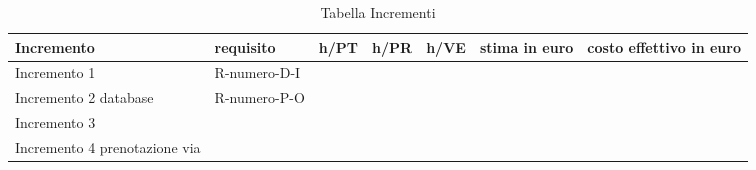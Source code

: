 \hypertarget{TabellaIncrementi}{}
\begin{longtable}{ C{0.15\textwidth} C{0.15\textwidth} C{0.1\textwidth} C{0.1\textwidth} C{0.1\textwidth} C{0.1\textwidth} C{0.1\textwidth} }
    \caption{Tabella Incrementi}                                                                                 \\
    \rowcolor{\primaryColor}
    \textcolor{\secondaryColor}{\textbf{Incremento}} & \textcolor{\secondaryColor}{\textbf{requisito}}& \textcolor{\secondaryColor}{\textbf{h/PT}} & \textcolor{\secondaryColor}{\textbf{h/PR}}& \textcolor{\secondaryColor}{\textbf{h/VE}}& \textcolor{\secondaryColor}{\textbf{stima in euro}}&\textcolor{\secondaryColor}{\textbf{costo effettivo in euro}}\\ \endhead
    {Incremento 1 } & {R-numero-D-I } & { } & {}& {}& {}& {}\\
    {Incremento 2 database} & {R-numero-P-O} & { }& {}& {}& {}& {} \\
    {Incremento 3 } & {} & {}& {}& {}& {}& {}\\
    {Incremento 4 prenotazione via } & {} & {}& {}& {}& {}& {}\\
\end{longtable}